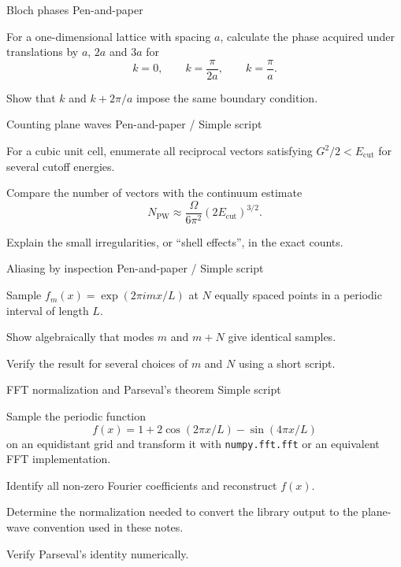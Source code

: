 \begin{exci}{Bloch phases \hfill\textnormal{\small Pen-and-paper}}
    \item For a one-dimensional lattice with spacing $a$, calculate the phase
    acquired under translations by $a$, $2a$ and $3a$ for
    \begin{equation*}
        k=0,\qquad k=\frac{\pi}{2a},\qquad k=\frac{\pi}{a}.
    \end{equation*}
    \item Show that $k$ and $k+2\pi/a$ impose the same boundary condition.
\end{exci}

\begin{exci}{Counting plane waves \hfill\textnormal{\small Pen-and-paper / Simple script}}
    \item For a cubic unit cell, enumerate all reciprocal vectors satisfying
    $G^{2}/2<E_{\textrm{cut}}$ for several cutoff energies.
    \item Compare the number of vectors with the continuum estimate
    \begin{equation*}
        N_{\textrm{PW}}\approx
        \frac{\Omega}{6\pi^{2}}(2E_{\textrm{cut}})^{3/2}.
    \end{equation*}
    \item Explain the small irregularities, or ``shell effects'', in the exact
    counts.
\end{exci}

\begin{exci}{Aliasing by inspection \hfill\textnormal{\small Pen-and-paper / Simple script}}
    \item Sample $f_m(x)=\exp(2\pi i m x/L)$ at $N$ equally spaced points in a
    periodic interval of length $L$.
    \item Show algebraically that modes $m$ and $m+N$ give identical samples.
    \item Verify the result for several choices of $m$ and $N$ using a short
    script.
\end{exci}

\begin{exci}{FFT normalization and Parseval's theorem \hfill\textnormal{\small Simple script}}
    \item Sample the periodic function
    \begin{equation*}
        f(x)=1+2\cos(2\pi x/L)-\sin(4\pi x/L)
    \end{equation*}
    on an equidistant grid and transform it with \texttt{numpy.fft.fft} or an
    equivalent FFT implementation.
    \item Identify all non-zero Fourier coefficients and reconstruct $f(x)$.
    \item Determine the normalization needed to convert the library output to
    the plane-wave convention used in these notes.
    \item Verify Parseval's identity numerically.
\end{exci}


